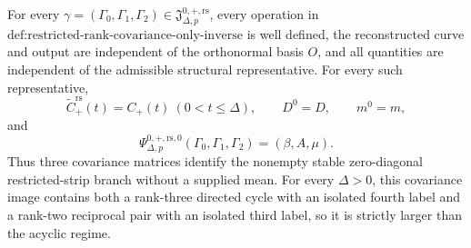 For every \(\gamma=(\Gamma_0,\Gamma_1,\Gamma_2)\in
\mathfrak J_{\Delta,p}^{0,+,\mathrm{rs}}\), every operation in \(\text{def:restricted-rank-covariance-only-inverse}\) is well defined, the reconstructed curve and output are independent of the orthonormal basis \(O\), and all quantities are independent of the admissible structural representative.  For every such representative,
\[
 \widetilde C_{+}^{\mathrm{rs}}(t)=C_{+}(t)\ (0<t\leq\Delta),
 \qquad D^0=D,\qquad m^0=m,
\]
and
\[
 \Psi_{\Delta,p}^{0,+,\mathrm{rs},0}
 (\Gamma_0,\Gamma_1,\Gamma_2)=(\beta,A,\mu).
\]
Thus three covariance matrices identify the nonempty stable zero-diagonal restricted-strip branch without a supplied mean.  For every \(\Delta>0\), this covariance image contains both a rank-three directed cycle with an isolated fourth label and a rank-two reciprocal pair with an isolated third label, so it is strictly larger than the acyclic regime.